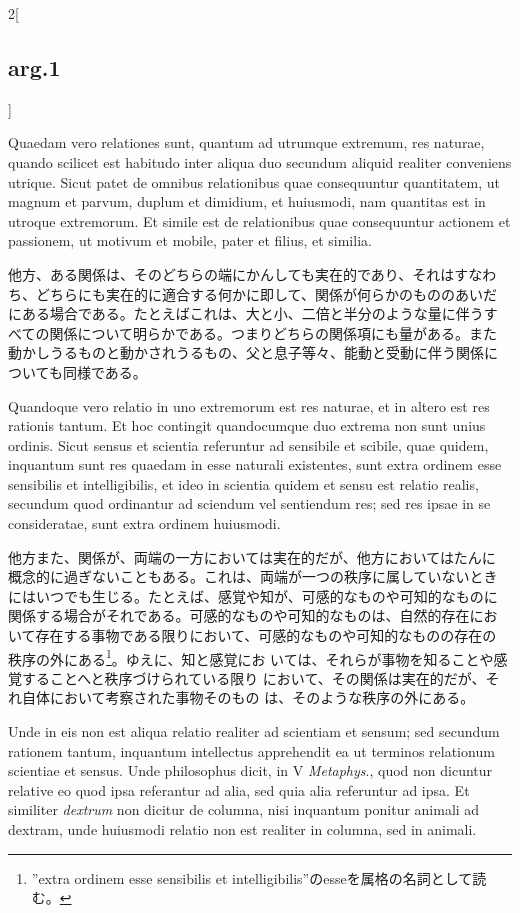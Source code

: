 \documentclass[paper=a4paper,fontsize=10pt,jafontsize=9pt,titlepage]{jlreq}
\begin{document}
\begin{paracol}{2}[\subsection{arg.1}]
\switchcolumn*

Quaedam vero relationes sunt, quantum ad utrumque extremum, res
naturae, quando scilicet est habitudo inter aliqua duo secundum
aliquid realiter conveniens utrique. Sicut patet de omnibus
relationibus quae consequuntur quantitatem, ut magnum et parvum,
duplum et dimidium, et huiusmodi, nam quantitas est in utroque
extremorum. Et simile est de relationibus quae consequuntur actionem
et passionem, ut motivum et mobile, pater et filius, et similia.

\switchcolumn

他方、ある関係は、そのどちらの端にかんしても実在的であり、それはすなわ
ち、どちらにも実在的に適合する何かに即して、関係が何らかのもののあいだ
にある場合である。たとえばこれは、大と小、二倍と半分のような量に伴うす
べての関係について明らかである。つまりどちらの関係項にも量がある。また
動かしうるものと動かされうるもの、父と息子等々、能動と受動に伴う関係に
ついても同様である。

\switchcolumn*

Quandoque vero relatio in uno extremorum est res naturae, et in altero
est res rationis tantum. Et hoc contingit quandocumque duo extrema non
sunt unius ordinis. Sicut sensus et scientia referuntur ad sensibile
et scibile, quae quidem, inquantum sunt res quaedam in esse naturali
existentes, sunt extra ordinem esse sensibilis et intelligibilis, et
ideo in scientia quidem et sensu est relatio realis, secundum quod
ordinantur ad sciendum vel sentiendum res; sed res ipsae in se
consideratae, sunt extra ordinem huiusmodi.

\switchcolumn

他方また、関係が、両端の一方においては実在的だが、他方においてはたんに
概念的に過ぎないこともある。これは、両端が一つの秩序に属していないとき
にはいつでも生じる。たとえば、感覚や知が、可感的なものや可知的なものに
関係する場合がそれである。可感的なものや可知的なものは、自然的存在にお
いて存在する事物である限りにおいて、可感的なものや可知的なものの存在の
秩序の外にある\footnote{''extra ordinem esse sensibilis et
intelligibilis''のesseを属格の名詞として読む。}。ゆえに、知と感覚にお
いては、それらが事物を知ることや感覚することへと秩序づけられている限り
において、その関係は実在的だが、それ自体において考察された事物そのもの
は、そのような秩序の外にある。

\switchcolumn*

Unde in eis non est aliqua relatio realiter ad scientiam et sensum;
sed secundum rationem tantum, inquantum intellectus apprehendit ea ut
terminos relationum scientiae et sensus. Unde philosophus dicit, in V
{\itshape Metaphys}., quod non dicuntur relative eo quod ipsa
referantur ad alia, sed quia alia referuntur ad ipsa. Et similiter
{\itshape dextrum} non dicitur de columna, nisi inquantum ponitur
animali ad dextram, unde huiusmodi relatio non est realiter in
columna, sed in animali.


\end{paracol}
\end{document}
